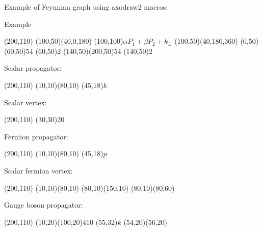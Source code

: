 \documentclass{article}
\begin{document}
Example of Feynman graph using axodraw2 macros:

Example

\begin{center}
    \begin{axopicture}(200,110)
        \Arc[arrow](100,50)(40,0,180)
        \Text(100,100){$\alpha P_1 + \beta P_2 + k_\perp$}
        \Arc[arrow](100,50)(40,180,360)
        \Gluon(0,50)(60,50){5}{4}
        \Vertex(60,50){2}
        \Gluon(140,50)(200,50){5}{4}
        \Vertex(140,50){2}
    \end{axopicture}
\end{center}

Scalar propagator:

\begin{center}
    \begin{axopicture}(200,110)
    (10,10)(80,10)
    \Text(45,18){$k$}
    \end{axopicture}
\end{center}

Scalar vertex:

\begin{center}
    \begin{axopicture}(200,110)
        \GCirc(30,30){2}{0}
    \end{axopicture}
\end{center}

Fermion propagator:

\begin{center}
    \begin{axopicture}(200,110)
    (10,10)(80,10)
    \Text(45,18){$p$}
    \end{axopicture}
\end{center}

Scalar fermion vertex:

\begin{center}
    \begin{axopicture}(200,110)
    \Line[arrow](10,10)(80,10)
    \Line[arrow](80,10)(150,10)
    \Line[dash](80,10)(80,60)
    \end{axopicture}
\end{center}

Gauge boson propagator:

\begin{center}
    \begin{axopicture}(200,110)
    \Photon(10,20)(100,20){4}{10}
    \Text(55,32){$k$}
    \Line[arrow,arrowscale=1.4](54,20)(56,20)
    \end{axopicture}
\end{center}
\end{document}
